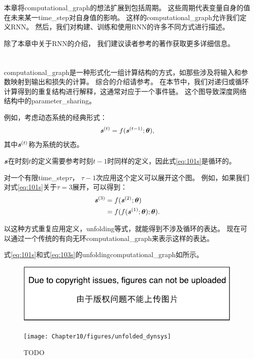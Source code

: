 本章将\gls{computational_graph}的想法扩展到包括周期。
这些周期代表变量自身的值在未来某一\gls{time_step}对自身值的影响。
这样的\gls{computational_graph}允许我们定义\gls{RNN}。
然后，我们对构建、训练和使用\gls{RNN}的许多不同方式进行描述。

除了本章中关于\gls{RNN}的介绍， 我们建议读者参考\cite{Graves-book2012}的著作获取更多详细信息。


\section{}
\label{sec:unfolding_computational_graphs}
\gls{computational_graph}是一种形式化一组计算结构的方式，如那些涉及将输入和参数映射到输出和损失的计算。
综合的介绍请参考。
在本节中，我们对递归或循环计算得到的重复结构进行解释，这通常对应于一个事件链。
这个图导致深度网络结构中的\gls{parameter_sharing}。

例如，考虑动态系统的经典形式：
\begin{align}
\label{eq:101s}
\boldsymbol{\mathit{s}}^{(t)} = f(\boldsymbol{\mathit{s}}^{(t-1)}; \boldsymbol{\theta}),
\end{align}
其中$ \boldsymbol{\mathit{s}}^{(t)}$称为系统的状态。

$\boldsymbol{\mathit{s}}$在时刻$t$的定义需要参考时刻$t-1$时同样的定义，因此式\eqref{eq:101s}是循环的。

对一个有限\gls{time_step}$\tau$， $\tau-1$次应用这个定义可以展开这个图。
例如，如果我们对式\eqref{eq:101s}关于$\tau = 3$展开，可以得到：
\begin{align}
 \boldsymbol{\mathit{s}}^{(3)} &= f(\boldsymbol{\mathit{s}}^{(2)}; \boldsymbol{\theta}) \\
 & = f(f(\boldsymbol{\mathit{s}}^{(1)}; \boldsymbol{\theta}) ; \boldsymbol{\theta}).
  \label{eq:103s}
\end{align}

以这种方式重复应用定义，\gls{unfolding}等式，就能得到不涉及循环的表达。
现在可以通过一个传统的有向无环\gls{computational_graph}来表示这样的表达。

式\eqref{eq:101s}和式\eqref{eq:103s}的\gls{unfolding}\gls{computational_graph}如所示。
\begin{figure}[!htb]
\ifOpenSource
\centerline{\includegraphics{figure.pdf}}
\else
\centerline{\texttt{[image: Chapter10/figures/unfolded\_dynsys]}}
\fi
\caption{TODO}
\label{fig:chap10_unfolded_dynsys}
\end{figure}

